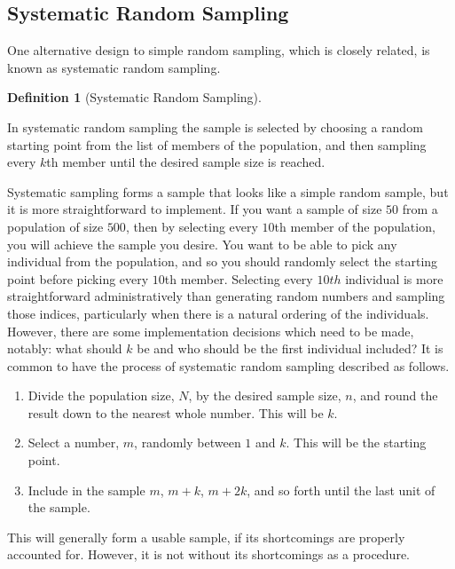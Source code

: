 \documentclass[
  letterpaper,
  DIV=11,
  numbers=noendperiod]{scrreprt}
\providecommand{\tightlist}{%
  \setlength{\itemsep}{0pt}\setlength{\parskip}{0pt}}\usepackage{longtable,booktabs,array}
\theoremstyle{definition}
\theoremstyle{definition}
\theoremstyle{definition}
\newtheorem{definition}{Definition}[chapter]
\theoremstyle{remark}
\begin{document}
\subsection{Systematic Random
Sampling}\label{systematic-random-sampling}

One alternative design to simple random sampling, which is closely
related, is known as systematic random sampling.

\begin{definition}[Systematic Random
Sampling]\protect\hypertarget{def-systematic-rs}{}\label{def-systematic-rs}

In systematic random sampling the sample is selected by choosing a
random starting point from the list of members of the population, and
then sampling every \(k\)th member until the desired sample size is
reached.

\end{definition}

Systematic sampling forms a sample that looks like a simple random
sample, but it is more straightforward to implement. If you want a
sample of size \(50\) from a population of size \(500\), then by
selecting every \(10\)th member of the population, you will achieve the
sample you desire. You want to be able to pick any individual from the
population, and so you should randomly select the starting point before
picking every \(10\)th member. Selecting every \(10th\) individual is
more straightforward administratively than generating random numbers and
sampling those indices, particularly when there is a natural ordering of
the individuals. However, there are some implementation decisions which
need to be made, notably: what should \(k\) be and who should be the
first individual included? It is common to have the process of
systematic random sampling described as follows.

\begin{enumerate}
\def\labelenumi{\arabic{enumi}.}
\tightlist
\item
  Divide the population size, \(N\), by the desired sample size, \(n\),
  and round the result down to the nearest whole number. This will be
  \(k\).
\item
  Select a number, \(m\), randomly between \(1\) and \(k\). This will be
  the starting point.
\item
  Include in the sample \(m\), \(m+k\), \(m+2k\), and so forth until the
  last unit of the sample.
\end{enumerate}

This will generally form a usable sample, if its shortcomings are
properly accounted for. However, it is not without its shortcomings as a
procedure.
\end{document}

